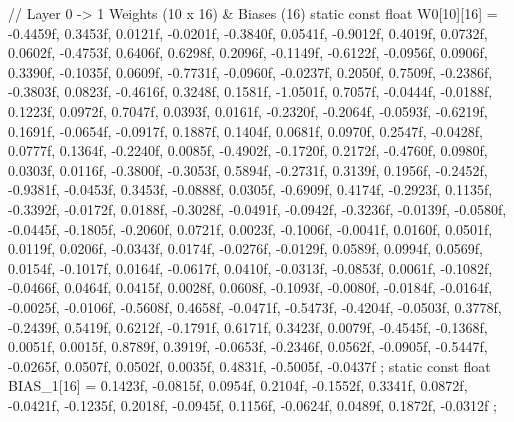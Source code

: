\begin{cppbox}
{    // Layer 0 -> 1 Weights (10 x 16) & Biases (16)
    static const float W0[10][16] = {
        {-0.4459f, 0.3453f, 0.0121f, -0.0201f, -0.3840f, 0.0541f, -0.9012f, 0.4019f, 0.0732f, 0.0602f, -0.4753f, 0.6406f, 0.6298f, 0.2096f, -0.1149f, -0.6122f},
        {-0.0956f, 0.0906f, 0.3390f, -0.1035f, 0.0609f, -0.7731f, -0.0960f, -0.0237f, 0.2050f, 0.7509f, -0.2386f, -0.3803f, 0.0823f, -0.4616f, 0.3248f, 0.1581f},
        {-1.0501f, 0.7057f, -0.0444f, -0.0188f, 0.1223f, 0.0972f, 0.7047f, 0.0393f, 0.0161f, -0.2320f, -0.2064f, -0.0593f, -0.6219f, 0.1691f, -0.0654f, -0.0917f},
        {0.1887f, 0.1404f, 0.0681f, 0.0970f, 0.2547f, -0.0428f, 0.0777f, 0.1364f, -0.2240f, 0.0085f, -0.4902f, -0.1720f, 0.2172f, -0.4760f, 0.0980f, 0.0303f},
        {0.0116f, -0.3800f, -0.3053f, 0.5894f, -0.2731f, 0.3139f, 0.1956f, -0.2452f, -0.9381f, -0.0453f, 0.3453f, -0.0888f, 0.0305f, -0.6909f, 0.4174f, -0.2923f},
        {0.1135f, -0.3392f, -0.0172f, 0.0188f, -0.3028f, -0.0491f, -0.0942f, -0.3236f, -0.0139f, -0.0580f, -0.0445f, -0.1805f, -0.2060f, 0.0721f, 0.0023f, -0.1006f},
        {-0.0041f, 0.0160f, 0.0501f, 0.0119f, 0.0206f, -0.0343f, 0.0174f, -0.0276f, -0.0129f, 0.0589f, 0.0994f, 0.0569f, 0.0154f, -0.1017f, 0.0164f, -0.0617f},
        {0.0410f, -0.0313f, -0.0853f, 0.0061f, -0.1082f, -0.0466f, 0.0464f, 0.0415f, 0.0028f, 0.0608f, -0.1093f, -0.0080f, -0.0184f, -0.0164f, -0.0025f, -0.0106f},
        {-0.5608f, 0.4658f, -0.0471f, -0.5473f, -0.4204f, -0.0503f, 0.3778f, -0.2439f, 0.5419f, 0.6212f, -0.1791f, 0.6171f, 0.3423f, 0.0079f, -0.4545f, -0.1368f},
        {0.0051f, 0.0015f, 0.8789f, 0.3919f, -0.0653f, -0.2346f, 0.0562f, -0.0905f, -0.5447f, -0.0265f, 0.0507f, 0.0502f, 0.0035f, 0.4831f, -0.5005f, -0.0437f}
    };
    static const float BIAS_1[16] = {
        0.1423f, -0.0815f, 0.0954f, 0.2104f, -0.1552f, 0.3341f, 0.0872f, -0.0421f,
        -0.1235f, 0.2018f, -0.0945f, 0.1156f, -0.0624f, 0.0489f, 0.1872f, -0.0312f
    };

}
\end{cppbox}
